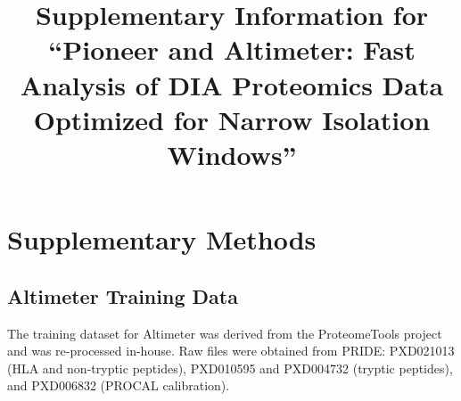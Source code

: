\documentclass[pdflatex,sn-nature]{sn-jnl}
\begin{document}
\title[Supplementary Information]{Supplementary Information for ``Pioneer and Altimeter: Fast Analysis of DIA Proteomics Data Optimized for Narrow Isolation Windows''}

\author[1]{ }
\author[1]{ }
\author[1,2]{ }
\author*[1,3]{ }


\maketitle





\section{Supplementary Methods}

\subsection{Altimeter Training Data}
The training dataset for Altimeter was derived from the ProteomeTools project and was re-processed in-house. Raw files were obtained from PRIDE: PXD021013 (HLA and non-tryptic peptides), PXD010595 and PXD004732 (tryptic peptides), and PXD006832 (PROCAL calibration).

\end{document}
